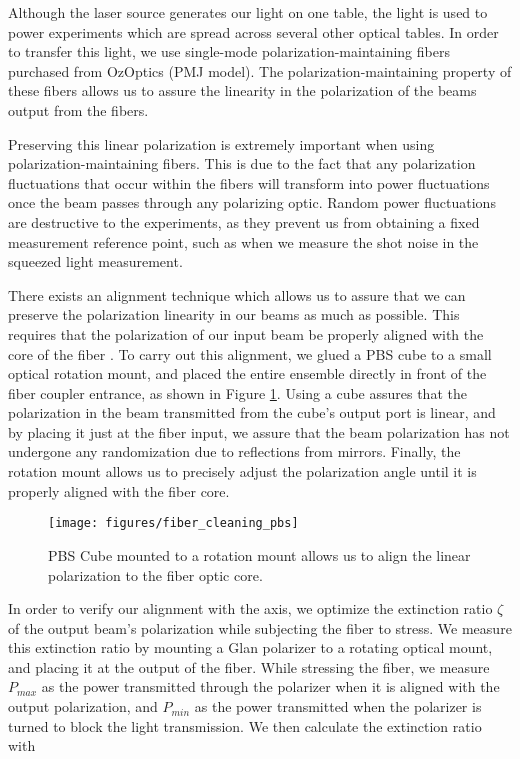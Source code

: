 Although the laser source generates our light on one table, the light is used to power experiments which are spread across several other optical tables.  In order to transfer this light, we use single-mode polarization-maintaining fibers purchased from OzOptics (PMJ model).  The polarization-maintaining property of these fibers allows us to assure the linearity in the polarization of the beams output from the fibers.

Preserving this linear polarization is extremely important when using polarization-maintaining fibers.  This is due to the fact that any polarization fluctuations that occur within the fibers will transform into power fluctuations once the beam passes through any polarizing optic.  Random power fluctuations are destructive to the experiments, as they prevent us from obtaining a fixed measurement reference point, such as when we measure the shot noise in the squeezed light measurement.

There exists an alignment technique which allows us to assure that we can preserve the polarization linearity in our beams as much as possible. This requires that the polarization of our input beam be properly aligned with the core of the fiber \cite{aalto:2861}.  To carry out this alignment, we glued a PBS cube to a small optical rotation mount, and placed the entire ensemble directly in front of the fiber coupler entrance, as shown in Figure \ref{fig:pbs_coupler}.  Using a cube assures that the polarization in the beam transmitted from the cube's output port is linear, and by placing it just at the fiber input, we assure that the beam polarization has not undergone any randomization due to reflections from mirrors.  Finally, the rotation mount allows us to precisely adjust the polarization angle until it is properly aligned with the fiber core.


\begin{figure}[!ht] 
 \centering 
 \texttt{[image: figures/fiber\_cleaning\_pbs]} 
 \caption[Polarization alignment for fiber optics]{PBS Cube mounted to a rotation mount allows us to align the linear polarization to the fiber optic core.} 
 \label{fig:pbs_coupler} 
\end{figure} 

In order to verify our alignment with the axis, we optimize the extinction ratio $\zeta $ of the output beam's polarization while subjecting the fiber to stress.  We measure this extinction ratio by mounting a Glan polarizer to a rotating optical mount, and placing it at the output of the fiber.  While stressing the fiber, we measure $P_{max}$ as the power transmitted through the polarizer when it is aligned with the output polarization, and $P_{min}$ as the power transmitted when the polarizer is turned to block the light transmission.  We then calculate the extinction ratio with

